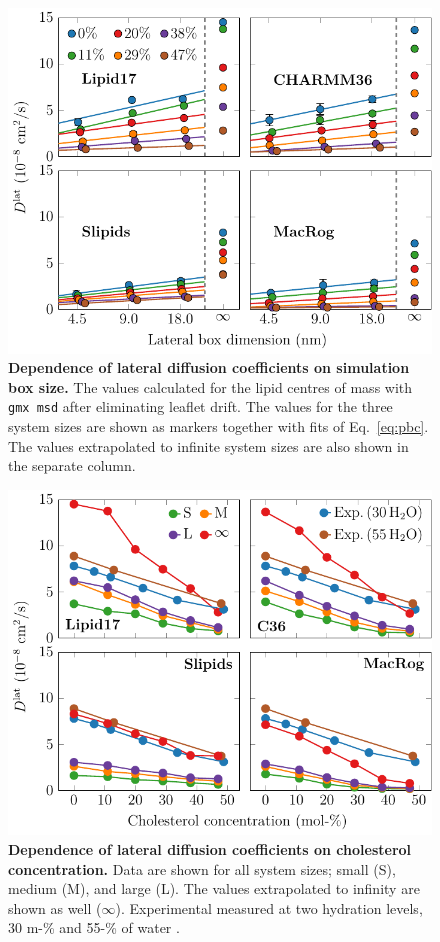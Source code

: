 \documentclass[journal=jpcbfk]{achemso}
\begin{document}
\begin{figure}[htb!]
    \centering
    \includegraphics[width=0.9\linewidth]{../FIGS/d_vs_size.pdf}
    \caption{\label{SIfig:dvssize}%
    \textbf{Dependence of lateral diffusion coefficients on simulation box size.} The values calculated for the lipid centres of mass with \texttt{gmx msd} after eliminating leaflet drift. The values for the three system sizes are shown as markers together with fits of Eq.~\eqref{eq:pbc}. The values extrapolated to infinite system sizes are also shown in the separate column. 
    }
\end{figure}

\begin{figure}[htb!]
    \centering
    \includegraphics[width=0.9\linewidth]{../FIGS/d_vs_chol.pdf}
    \caption{\label{SIfig:dvschol}%
     \textbf{Dependence of lateral diffusion coefficients on cholesterol concentration.} Data are shown for all system sizes; small (S), medium (M), and large (L). The values extrapolated to infinity are shown as well ($\infty$). Experimental measured at two hydration levels, 30 m-\% and 55-\% of water \cite{filippov2003effect,filippov2003influence}.
    }
\end{figure}
\end{document}
